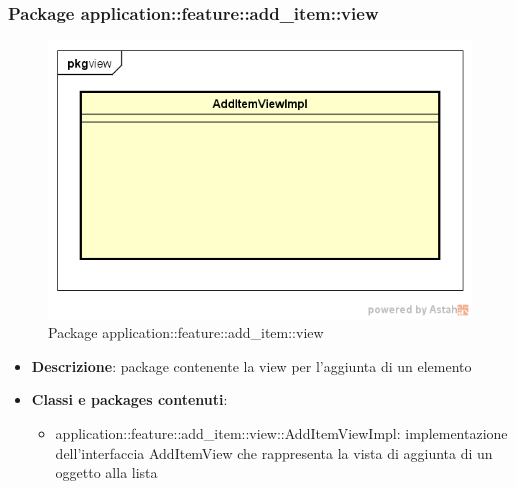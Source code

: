 \subsubsection{Package application::feature::add\_item::view}
\label{Package application::feature::add_item::view}
\begin{figure}[H]
	\centering
	\includegraphics[scale=0.5]{Sezioni/Packages/Application/add_item_view.png}
	\caption{Package application::feature::add\_item::view}
\end{figure}
\begin{itemize}
	\item \textbf{Descrizione}: package contenente la view per l'aggiunta di un elemento
	\item \textbf{Classi e packages contenuti}:
	\begin{itemize}
	\item application::feature::add\_item::view::AddItemViewImpl: implementazione dell'interfaccia AddItemView che rappresenta la vista di aggiunta di un oggetto alla lista
	\end{itemize}
\end{itemize}

